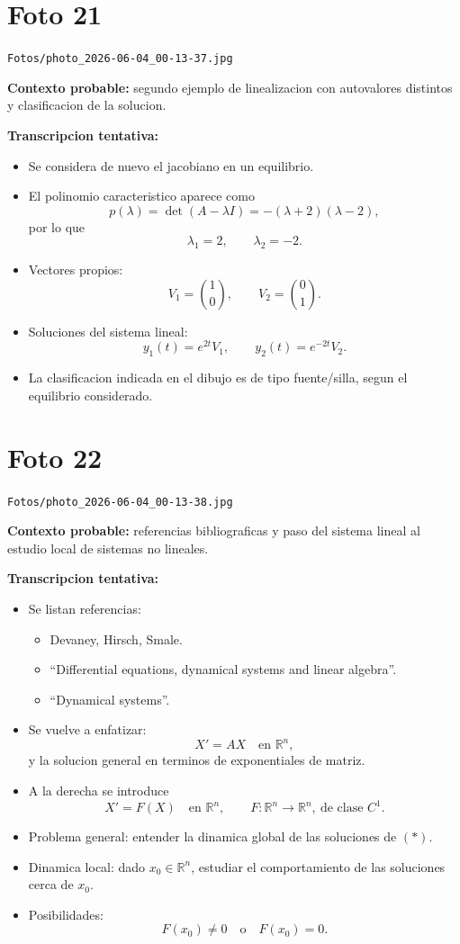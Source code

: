 \documentclass[11pt,letterpaper]{article}
\begin{document}
\section*{Foto 21}
\texttt{Fotos/photo\_2026-06-04\_00-13-37.jpg}

\textbf{Contexto probable:} segundo ejemplo de linealizacion con autovalores distintos y clasificacion de la solucion.

\textbf{Transcripcion tentativa:}
\begin{itemize}[leftmargin=*]
    \item Se considera de nuevo el jacobiano en un equilibrio.
    \item El polinomio caracteristico aparece como
    \[
    p(\lambda)=\det(A-\lambda I)=-(\lambda+2)(\lambda-2),
    \]
    por lo que
    \[
    \lambda_1=2,\qquad \lambda_2=-2.
    \]
    \item Vectores propios:
    \[
    V_1=\binom{1}{0},
    \qquad
    V_2=\binom{0}{1}.
    \]
    \item Soluciones del sistema lineal:
    \[
    y_1(t)=e^{2t}V_1,
    \qquad
    y_2(t)=e^{-2t}V_2.
    \]
    \item La clasificacion indicada en el dibujo es de tipo fuente/silla, segun el equilibrio considerado.
\end{itemize}

\section*{Foto 22}
\texttt{Fotos/photo\_2026-06-04\_00-13-38.jpg}

\textbf{Contexto probable:} referencias bibliograficas y paso del sistema lineal al estudio local de sistemas no lineales.

\textbf{Transcripcion tentativa:}
\begin{itemize}[leftmargin=*]
    \item Se listan referencias:
    \begin{itemize}
        \item Devaney, Hirsch, Smale.
        \item ``Differential equations, dynamical systems and linear algebra''.
        \item ``Dynamical systems''.
    \end{itemize}
    \item Se vuelve a enfatizar:
    \[
    X'=AX \quad \text{en } \mathbb{R}^n,
    \]
    y la solucion general en terminos de exponentiales de matriz.
    \item A la derecha se introduce
    \[
    X' = F(X) \quad \text{en } \mathbb{R}^n,
    \qquad F:\mathbb{R}^n\to\mathbb{R}^n,\ \text{de clase } C^1.
    \]
    \item Problema general: entender la dinamica global de las soluciones de \((*)\).
    \item Dinamica local: dado \(x_0\in\mathbb{R}^n\), estudiar el comportamiento de las soluciones cerca de \(x_0\).
    \item Posibilidades:
    \[
    F(x_0)\neq 0 \quad \text{o} \quad F(x_0)=0.
    \]
\end{itemize}
\end{document}
